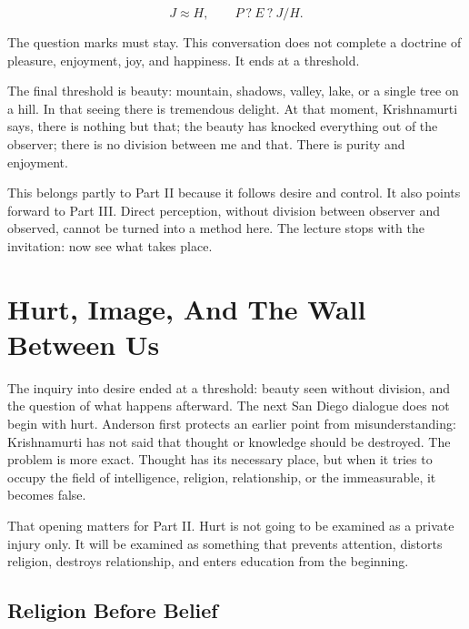 \documentclass[11pt,oneside]{book}
\begin{document}
\begin{equation}
J \approx H,
\qquad
P \ ? \ E \ ? \ J/H.
\end{equation}

The question marks must stay. This conversation does not complete a doctrine of pleasure, enjoyment, joy, and happiness. It ends at a threshold.

The final threshold is beauty: mountain, shadows, valley, lake, or a single tree on a hill. In that seeing there is tremendous delight. At that moment, Krishnamurti says, there is nothing but that; the beauty has knocked everything out of the observer; there is no division between me and that. There is purity and enjoyment.

This belongs partly to Part II because it follows desire and control. It also points forward to Part III. Direct perception, without division between observer and observed, cannot be turned into a method here. The lecture stops with the invitation: now see what takes place.


\chapter{Hurt, Image, And The Wall Between Us}

The inquiry into desire ended at a threshold: beauty seen without division, and the question of what happens afterward. The next San Diego dialogue does not begin with hurt. Anderson first protects an earlier point from misunderstanding: Krishnamurti has not said that thought or knowledge should be destroyed. The problem is more exact. Thought has its necessary place, but when it tries to occupy the field of intelligence, religion, relationship, or the immeasurable, it becomes false.

That opening matters for Part II. Hurt is not going to be examined as a private injury only. It will be examined as something that prevents attention, distorts religion, destroys relationship, and enters education from the beginning.

\section{Religion Before Belief}
\end{document}
